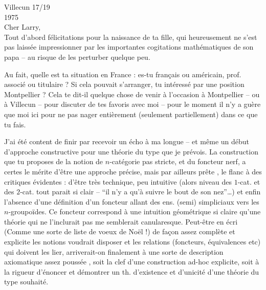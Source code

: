 \hfill Villecun 17/19 \\
\hfill 1975\\
Cher Larry,\\

Tout d'abord félicitations pour la naissance de ta fille, qui heureusement ne s'est pas laissée impressionner par les importantes cogitations mathématiques de son papa -- au risque de les perturber quelque peu.

Au fait, quelle est ta situation en France : es-tu français ou américain, prof. associé ou titulaire ? Si cela pouvait s'arranger,  tu intéressé par une position  Montpellier ? Cela te dit-il quelque chose de venir à l'occasion à Montpellier -- ou à Villecun -- pour discuter de tes favoris avec moi -- pour le moment il n'y a guère que moi ici pour ne pas nager entièrement (seulement partiellement) dans ce que tu fais.

J'ai été content de finir par recevoir un écho à ma longue  -- et même un début d'approche constructive pour  une théorie du type que je prévois. La construction que tu proposes de la notion de $n$-catégorie pas stricte, et du foncteur nerf, a certes le mérite  d'être une  approche précise, mais par ailleurs prête  , le flanc à des critiques évidentes : d'être très technique, peu intuitive (alors  niveau des $1$-cat. et
 des $2$-cat. tout parait si clair -- ``il n'y a qu'à suivre le bout de son nez''\dots) et enfin l'absence d'une définition d'un foncteur allant des ens. (semi) simpliciaux vers les $n$-groupoïdes. Ce foncteur correspond à une intuition géométrique si claire qu'une théorie qui ne l'inclurait pas me semblerait canularesque. Peut-être en écri (Comme une sorte de liste de voeux de Noël !) de façon assez complète et explicite les  notions  voudrait disposer et les relations (foncteurs, équivalences etc) qui doivent les lier, arriverait-on finalement à une sorte de description axiomatique assez poussée , soit  la clef d'une construction ad-hoc explicite, soit  à la rigueur d'énoncer et démontrer un th. d'existence et d'unicité d'une théorie du type souhaité.


